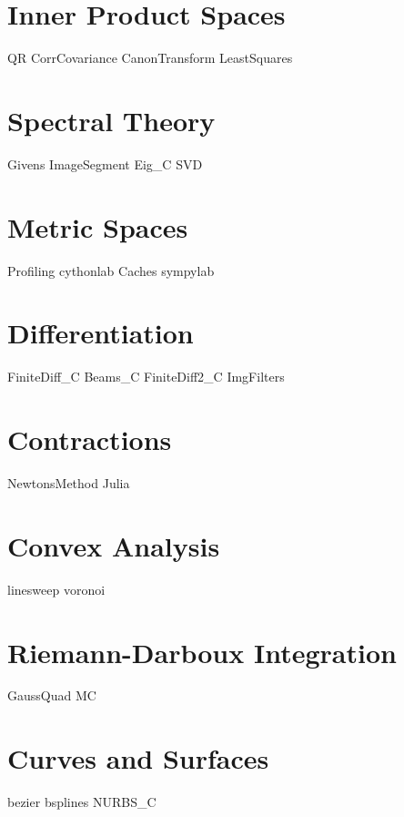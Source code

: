 \documentclass[nociteref]{newsiambook}
\begin{document}
\part{Inner Product Spaces}
{QR}
{CorrCovariance}
{CanonTransform}
{LeastSquares}

\part{Spectral Theory}
{Givens}
{ImageSegment}
{Eig_C}
{SVD}

\part{Metric Spaces}
{Profiling}
{cythonlab}
{Caches}
{sympylab}

\part{Differentiation}
{FiniteDiff_C}
{Beams_C}
{FiniteDiff2_C}
{ImgFilters}

\part{Contractions}
{NewtonsMethod}
{Julia}

\part{Convex Analysis}
{linesweep}
{voronoi}

\part{Riemann-Darboux Integration}
{GaussQuad}
{MC}

\part{Curves and Surfaces}
{bezier}
{bsplines}
{NURBS_C}
\end{document}
